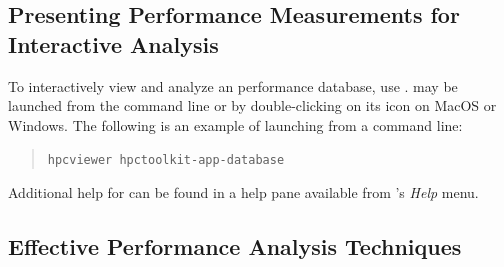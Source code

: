 \documentclass[11pt,twoside,letterpaper]{report}
\begin{document}

\subsection{Presenting Performance Measurements for Interactive Analysis}

To interactively view and analyze an \HPCToolkit{} performance database, use \hpcviewer{}.
\hpcviewer{} may be launched from the command line or by double-clicking on its icon on MacOS or Windows.
The following is an example of launching from a command line:
\begin{quote}
  \verb|hpcviewer hpctoolkit-app-database|
\end{quote}
Additional help for \hpcviewer{} can be found in a help pane available from \hpcviewer{}'s \emph{Help} menu.


\subsection{Effective Performance Analysis Techniques}
\end{document}
